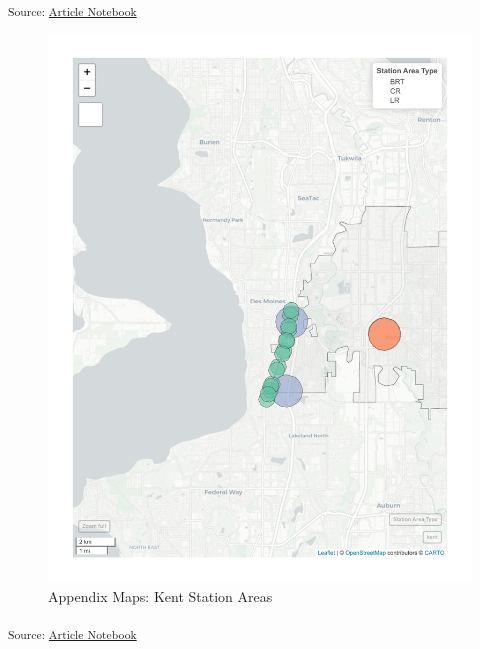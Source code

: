 \documentclass[
]{agujournal2019}
\begin{document}
\textsubscript{Source:
\href{https://tiernanmartin.github.io/2024-transit-oriented-development-bill/index.qmd.html}{Article
Notebook}}

\begin{figure}[H]

{\centering \includegraphics{index_files/figure-pdf/appendix-case-studies-kent-stations-map-1.pdf}

}

\caption{Appendix Maps: Kent Station Areas}

\end{figure}%

\textsubscript{Source:
\href{https://tiernanmartin.github.io/2024-transit-oriented-development-bill/index.qmd.html}{Article
Notebook}}
\end{document}
